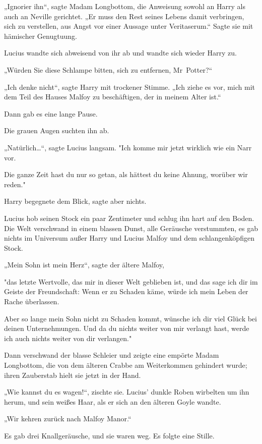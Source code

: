 {„Ignorier ihn“, sagte Madam Longbottom, die Anweisung sowohl an Harry als auch an Neville gerichtet. „Er muss den Rest seines Lebens damit verbringen, sich zu verstellen, aus Angst vor einer Aussage unter Veritaserum.“ Sagte sie mit hämischer Genugtuung.

Lucius wandte sich abweisend von ihr ab und wandte sich wieder Harry zu.

„Würden Sie diese Schlampe bitten, sich zu entfernen, Mr~Potter?“

„Ich denke nicht“, sagte Harry mit trockener Stimme. „Ich ziehe es vor, mich mit dem Teil des Hauses Malfoy zu beschäftigen, der in meinem Alter ist.“

Dann gab es eine lange Pause.

Die grauen Augen suchten ihn ab.

„Natürlich…“, sagte Lucius langsam. "Ich komme mir jetzt wirklich wie ein Narr vor.

Die ganze Zeit hast du nur so getan, als hättest du keine Ahnung, worüber wir reden."

Harry begegnete dem Blick, sagte aber nichts.

Lucius hob seinen Stock ein paar Zentimeter und schlug ihn hart auf den Boden. Die Welt verschwand in einem blassen Dunst, alle Geräusche verstummten, es gab nichts im Universum außer Harry und Lucius Malfoy und dem schlangenköpfigen Stock.

„Mein Sohn ist mein Herz“, sagte der ältere Malfoy,

"das letzte Wertvolle, das mir in dieser Welt geblieben ist, und das sage ich dir im Geiste der Freundschaft: Wenn er zu Schaden käme, würde ich mein Leben der Rache überlassen.

Aber so lange mein Sohn nicht zu Schaden kommt, wünsche ich dir viel Glück bei deinen Unternehmungen. Und da du nichts weiter von mir verlangt hast, werde ich auch nichts weiter von dir verlangen."

Dann verschwand der blasse Schleier und zeigte eine empörte Madam Longbottom, die von dem älteren Crabbe am Weiterkommen gehindert wurde; ihren Zauberstab hielt sie jetzt in der Hand.

„Wie kannst du es wagen!“, zischte sie. Lucius' dunkle Roben wirbelten um ihn herum, und sein weißes Haar, als er sich an den älteren Goyle wandte.

„Wir kehren zurück nach Malfoy Manor.“

Es gab drei Knallgeräusche, und sie waren weg. Es folgte eine Stille.

}

